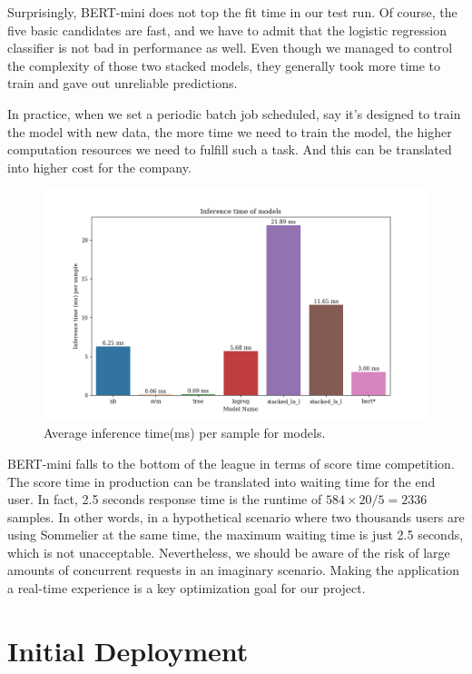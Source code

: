 \documentclass[
	a4paper,
	fontsize=10pt, %
	twoside=false, %
	secnumdepth=2, %
]{kaohandt}
\begin{document}
Surprisingly, BERT-mini does not top the fit time in our test run. Of course, the five basic candidates are fast, and we have to admit that the logistic regression classifier is not bad in performance as well. Even though we managed to control the complexity of those two stacked models, they generally took more time to train and gave out unreliable predictions.

In practice, when we set a periodic batch job scheduled, say it’s designed to train the model with new data, the more time we need to train the model, the higher computation resources we need to fulfill such a task. And this can be translated into higher cost for the company.

\begin{figure}[h]
	\includegraphics[]{inference_time.png}
	\caption{Average inference time(ms) per sample for models.}
	\label{fig:infer_time}
\end{figure}


BERT-mini falls to the bottom of the league in terms of score time competition. The score time in production can be translated into waiting time for the end user. In fact, 2.5 seconds response time is the runtime of $584\times 20 /5=2336$ samples. In other words, in a hypothetical scenario where two thousands users are using Sommelier at the same time, the maximum waiting time is just 2.5 seconds, which is not unacceptable. Nevertheless, we should be aware of the risk of large amounts of concurrent requests in an imaginary scenario. Making the application a real-time experience is a key optimization goal for our project.

\newpage

\section{Initial Deployment}
\end{document}
